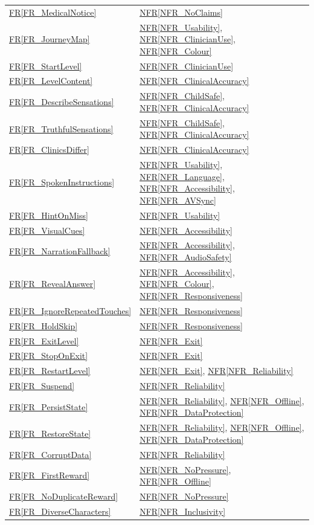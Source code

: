 \documentclass[10pt]{article}
\newcommand{\rref}[1]{\hyperref[#1]{FR\ref*{#1}}}
\newcommand{\nfrref}[1]{\hyperref[#1]{NFR\ref*{#1}}}
\begin{document}
\begin{longtable}{p{} p{}}
\rref{FR_MedicalNotice} & \nfrref{NFR_NoClaims} \\
\rref{FR_JourneyMap} & \nfrref{NFR_Usability}, \nfrref{NFR_ClinicianUse}, \nfrref{NFR_Colour} \\
\rref{FR_StartLevel} & \nfrref{NFR_ClinicianUse} \\
\rref{FR_LevelContent} & \nfrref{NFR_ClinicalAccuracy} \\
\rref{FR_DescribeSensations} & \nfrref{NFR_ChildSafe}, \nfrref{NFR_ClinicalAccuracy} \\
\rref{FR_TruthfulSensations} & \nfrref{NFR_ChildSafe}, \nfrref{NFR_ClinicalAccuracy} \\
\rref{FR_ClinicsDiffer} & \nfrref{NFR_ClinicalAccuracy} \\
\rref{FR_SpokenInstructions} & \nfrref{NFR_Usability}, \nfrref{NFR_Language}, \nfrref{NFR_Accessibility}, \nfrref{NFR_AVSync} \\
\rref{FR_HintOnMiss} & \nfrref{NFR_Usability} \\
\rref{FR_VisualCues} & \nfrref{NFR_Accessibility} \\
\rref{FR_NarrationFallback} & \nfrref{NFR_Accessibility}, \nfrref{NFR_AudioSafety} \\
\rref{FR_RevealAnswer} & \nfrref{NFR_Accessibility}, \nfrref{NFR_Colour}, \nfrref{NFR_Responsiveness} \\
\rref{FR_IgnoreRepeatedTouches} & \nfrref{NFR_Responsiveness} \\
\rref{FR_HoldSkip} & \nfrref{NFR_Responsiveness} \\
\rref{FR_ExitLevel} & \nfrref{NFR_Exit} \\
\rref{FR_StopOnExit} & \nfrref{NFR_Exit} \\
\rref{FR_RestartLevel} & \nfrref{NFR_Exit}, \nfrref{NFR_Reliability} \\
\rref{FR_Suspend} & \nfrref{NFR_Reliability} \\
\rref{FR_PersistState} & \nfrref{NFR_Reliability}, \nfrref{NFR_Offline}, \nfrref{NFR_DataProtection} \\
\rref{FR_RestoreState} & \nfrref{NFR_Reliability}, \nfrref{NFR_Offline}, \nfrref{NFR_DataProtection} \\
\rref{FR_CorruptData} & \nfrref{NFR_Reliability} \\
\rref{FR_FirstReward} & \nfrref{NFR_NoPressure}, \nfrref{NFR_Offline} \\
\rref{FR_NoDuplicateReward} & \nfrref{NFR_NoPressure} \\
\rref{FR_DiverseCharacters} & \nfrref{NFR_Inclusivity} \\

\end{longtable}
\end{document}
